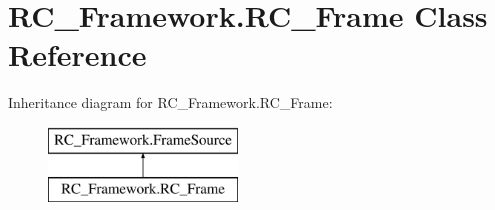 \hypertarget{class_r_c___framework_1_1_r_c___frame}{}\section{R\+C\+\_\+\+Framework.\+R\+C\+\_\+\+Frame Class Reference}
\label{class_r_c___framework_1_1_r_c___frame}
Inheritance diagram for R\+C\+\_\+\+Framework.\+R\+C\+\_\+\+Frame\+:\begin{figure}[H]
\begin{center}
\leavevmode
\includegraphics[height=2.000000cm]{class_r_c___framework_1_1_r_c___frame}
\end{center}
\end{figure}
